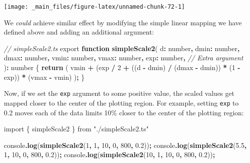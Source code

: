 \documentclass[
]{book}
\newenvironment{Shaded}{\begin{snugshade}}{\end{snugshade}}
\newcommand{\BuiltInTok}[1]{#1}
\newcommand{\CommentTok}[1]{\textcolor[rgb]{0.56,0.35,0.01}{\textit{#1}}}
\newcommand{\ControlFlowTok}[1]{\textcolor[rgb]{0.13,0.29,0.53}{\textbf{#1}}}
\newcommand{\DataTypeTok}[1]{\textcolor[rgb]{0.13,0.29,0.53}{#1}}
\newcommand{\DecValTok}[1]{\textcolor[rgb]{0.00,0.00,0.81}{#1}}
\newcommand{\FloatTok}[1]{\textcolor[rgb]{0.00,0.00,0.81}{#1}}
\newcommand{\FunctionTok}[1]{\textcolor[rgb]{0.13,0.29,0.53}{\textbf{#1}}}
\newcommand{\ImportTok}[1]{#1}
\newcommand{\KeywordTok}[1]{\textcolor[rgb]{0.13,0.29,0.53}{\textbf{#1}}}
\newcommand{\NormalTok}[1]{#1}
\newcommand{\OperatorTok}[1]{\textcolor[rgb]{0.81,0.36,0.00}{\textbf{#1}}}
\newcommand{\StringTok}[1]{\textcolor[rgb]{0.31,0.60,0.02}{#1}}
\theoremstyle{definition}
\theoremstyle{definition}
\theoremstyle{definition}
\theoremstyle{definition}
\theoremstyle{remark}
\begin{document}
\begin{center}\texttt{[image: \_main\_files/figure-latex/unnamed-chunk-72-1]} \end{center}

We \emph{could} achieve similar effect by modifying the simple linear mapping we have defined above and adding an additional argument:

\begin{Shaded}
\begin{Highlighting}[]
\CommentTok{// simpleScale2.ts}
\ImportTok{export} \KeywordTok{function} \FunctionTok{simpleScale2}\NormalTok{(}
\NormalTok{  d}\OperatorTok{:} \DataTypeTok{number}\OperatorTok{,}
\NormalTok{  dmin}\OperatorTok{:} \DataTypeTok{number}\OperatorTok{,}
\NormalTok{  dmax}\OperatorTok{:} \DataTypeTok{number}\OperatorTok{,}
\NormalTok{  vmin}\OperatorTok{:} \DataTypeTok{number}\OperatorTok{,}
\NormalTok{  vmax}\OperatorTok{:} \DataTypeTok{number}\OperatorTok{,}
\NormalTok{  exp}\OperatorTok{:} \DataTypeTok{number}\OperatorTok{,} \CommentTok{// Extra argument}
\NormalTok{)}\OperatorTok{:} \DataTypeTok{number}\NormalTok{ \{}
  \ControlFlowTok{return}\NormalTok{ (}
\NormalTok{    vmin }\OperatorTok{+}\NormalTok{ (exp }\OperatorTok{/} \DecValTok{2} \OperatorTok{+}\NormalTok{ ((d }\OperatorTok{{-}}\NormalTok{ dmin) }\OperatorTok{/}\NormalTok{ (dmax }\OperatorTok{{-}}\NormalTok{ dmin)) }\OperatorTok{*}\NormalTok{ (}\DecValTok{1} \OperatorTok{{-}}\NormalTok{ exp)) }\OperatorTok{*}\NormalTok{ (vmax }\OperatorTok{{-}}\NormalTok{ vmin)}
\NormalTok{  )}\OperatorTok{;}
\NormalTok{\}}
\end{Highlighting}
\end{Shaded}

Now, if we set the \texttt{exp} argument to some positive value, the scaled values get mapped closer to the center of the plotting region. For example, setting \texttt{exp} to 0.2 moves each of the data limits 10\% closer to the center of the plotting region:

\begin{Shaded}
\begin{Highlighting}[]
\ImportTok{import}\NormalTok{ \{ simpleScale2 \} }\ImportTok{from} \StringTok{"./simpleScale2.ts"}

\BuiltInTok{console}\OperatorTok{.}\FunctionTok{log}\NormalTok{(}\FunctionTok{simpleScale2}\NormalTok{(}\DecValTok{1}\OperatorTok{,} \DecValTok{1}\OperatorTok{,} \DecValTok{10}\OperatorTok{,} \DecValTok{0}\OperatorTok{,} \DecValTok{800}\OperatorTok{,} \FloatTok{0.2}\NormalTok{))}\OperatorTok{;}
\BuiltInTok{console}\OperatorTok{.}\FunctionTok{log}\NormalTok{(}\FunctionTok{simpleScale2}\NormalTok{(}\FloatTok{5.5}\OperatorTok{,} \DecValTok{1}\OperatorTok{,} \DecValTok{10}\OperatorTok{,} \DecValTok{0}\OperatorTok{,} \DecValTok{800}\OperatorTok{,} \FloatTok{0.2}\NormalTok{))}\OperatorTok{;}
\BuiltInTok{console}\OperatorTok{.}\FunctionTok{log}\NormalTok{(}\FunctionTok{simpleScale2}\NormalTok{(}\DecValTok{10}\OperatorTok{,} \DecValTok{1}\OperatorTok{,} \DecValTok{10}\OperatorTok{,} \DecValTok{0}\OperatorTok{,} \DecValTok{800}\OperatorTok{,} \FloatTok{0.2}\NormalTok{))}\OperatorTok{;}
\end{Highlighting}
\end{Shaded}
\end{document}
